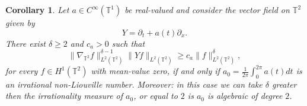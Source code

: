 \documentclass[11pt]{amsart}
\numberwithin{theorem}{section}
\numberwithin{equation}{section}
\newtheorem{corollary}[theorem]{Corollary}
\theoremstyle{definition}
\numberwithin{example}{section}
\theoremstyle{definition}
\theoremstyle{definition}
\newcommand{\T}{\mathbb{T}}
\begin{document}
\begin{corollary}\label{coro_tube_t2}
     Let $a\in C^\infty(\T^1)$ be real-valued and consider the vector field on $\T^2$ given by
     \begin{equation*}
         Y=\partial_t+a(t)\partial_x.
     \end{equation*}
     There exist $\delta\geq 2$ and  $c_a>0$ such that
          \begin{equation}\label{ineq_coro_tube_t2}
        \|\nabla_{\T^2} f\|_{L^2(\T^2)}^{\delta-1}\| Y f \|_{L^2(\T^2)}\geq c_a\|f\|_{L^2(\T^2)}^\delta,
    \end{equation}
    for every $f\in H^1(\T^2)$ with mean-value zero, if and only if 
     $a_0=\frac{1}{2\pi}\int_0^{2\pi} a(t)dt$ is an irrational non-Liouville number. Moreover: in this case we can take $\delta$ greater then the irrationality measure of $a_0$, or equal to $2$ is $a_0$ is algebraic of degree $2$. 
\end{corollary}
\end{document}
